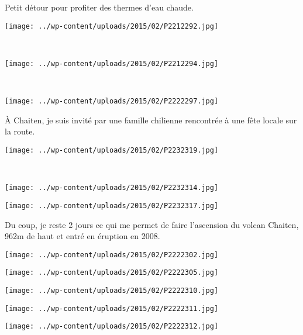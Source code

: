\pagebreak
Petit détour pour profiter des thermes d'eau chaude.
\begin{center} \texttt{[image: ../wp-content/uploads/2015/02/P2212292.jpg]} \end{center}
~\\
\begin{center} \texttt{[image: ../wp-content/uploads/2015/02/P2212294.jpg]} \end{center}
\vspace{-\topsep}
\pagebreak
~
\begin{center} \texttt{[image: ../wp-content/uploads/2015/02/P2222297.jpg]} \end{center}

\`A Chaiten, je suis invité par une famille chilienne rencontrée à une fête locale sur la route.
\begin{center} \texttt{[image: ../wp-content/uploads/2015/02/P2232319.jpg]} \end{center}
\vspace{-\topsep}

\pagebreak
~\\
\begin{center} \texttt{[image: ../wp-content/uploads/2015/02/P2232314.jpg]} \end{center}
\begin{center} \texttt{[image: ../wp-content/uploads/2015/02/P2232317.jpg]} \end{center}
\vspace{-\topsep}
\vspace{-3mm}

\pagebreak
Du coup, je reste 2 jours ce qui me permet de faire l'ascension du volcan Chaiten, 962m de haut et entré en éruption en 2008.
\begin{center} \texttt{[image: ../wp-content/uploads/2015/02/P2222302.jpg]} \end{center}
\begin{center} \texttt{[image: ../wp-content/uploads/2015/02/P2222305.jpg]} \end{center}
\begin{center} \texttt{[image: ../wp-content/uploads/2015/02/P2222310.jpg]} \end{center}
\begin{center} \texttt{[image: ../wp-content/uploads/2015/02/P2222311.jpg]} \end{center}
\begin{center} \texttt{[image: ../wp-content/uploads/2015/02/P2222312.jpg]} \end{center}

